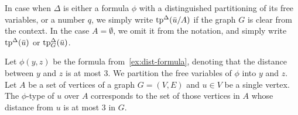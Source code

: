 







 





In  case when $\Delta$ is either a formula $\phi$ with a distinguished partitioning of its free variables, or a number $q$,
we simply write $\mathrm{tp}^\Delta(\bar u/A)$ if the graph $G$
is clear from the context. %
In the case $A=\emptyset$, we omit it from the notation, 
and simply write $\mathrm{tp}^\Delta(\bar u)$ or $\mathrm{tp}^\Delta_G(\bar u)$.

\begin{example}
Let $\phi(y,z)$	be the formula from~\cref{ex:dist-formula}, denoting that the distance between $y$ and $z$ is at most $3$.
We  partition  the free variables of $\phi$
into $y$ and $z$.
Let $A$ be a set of vertices of a graph $G=(V,E)$
and $u\in V$ be a single vertex.
The $\phi$-type of $u$ over $A$
corresponds to the set of those vertices in $A$
whose distance from $u$ is at most $3$ in $G$.
\end{example}


